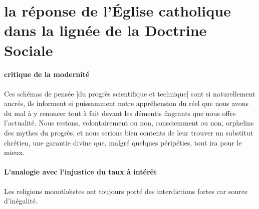 \section{la réponse de l'Église catholique dans la lignée de la Doctrine Sociale}    

\paragraph{critique de la modernité}
\begin{singlequote}
Ces schémas de pensée [du progrès scientifique et technique] sont si naturellement ancrés, ils informent si puissamment notre appréhension du réel que nous avons du mal à y renoncer tout à fait devant les démentis flagrants que nous offre l’actualité. Nous restons, volontairement ou non, consciemment ou non, orphelins des mythes du progrès, et nous serions bien contents de leur trouver un substitut chrétien, une garantie divine que, malgré quelques péripéties, tout ira pour le mieux. \cite[p.89]{candiard_quelques_2022}

\end{singlequote}

\paragraph{L'analogie avec l'injustice du taux à intérêt} Les religions monothéistes ont toujours porté des interdictions fortes car source d'inégalité. 

